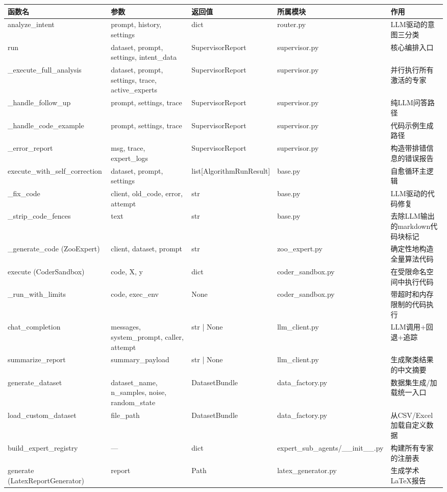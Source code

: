 \documentclass[11pt,a4paper]{ctexbook}
\begin{document}
\begin{longtable}{p{2.5cm} p{2.5cm} p{2cm} p{2cm} p{3.5cm}}
    \toprule
    \textbf{函数名} & \textbf{参数} & \textbf{返回值} & \textbf{所属模块} & \textbf{作用} \\
    \midrule
    analyze\_intent & prompt, history, settings & dict & router.py & LLM驱动的意图三分类 \\
    \midrule
    run & dataset, prompt, settings, intent\_data & SupervisorReport & supervisor.py & 核心编排入口 \\
    \midrule
    \_execute\_full\_analysis & dataset, prompt, settings, trace, active\_experts & SupervisorReport & supervisor.py & 并行执行所有激活的专家 \\
    \midrule
    \_handle\_follow\_up & prompt, settings, trace & SupervisorReport & supervisor.py & 纯LLM问答路径 \\
    \midrule
    \_handle\_code\_example & prompt, settings, trace & SupervisorReport & supervisor.py & 代码示例生成路径 \\
    \midrule
    \_error\_report & msg, trace, expert\_logs & SupervisorReport & supervisor.py & 构造带排错信息的错误报告 \\
    \midrule
    execute\_with\_self\_correction & dataset, prompt, settings & list[AlgorithmRunResult] & base.py & 自愈循环主逻辑 \\
    \midrule
    \_fix\_code & client, old\_code, error, attempt & str & base.py & LLM驱动的代码修复 \\
    \midrule
    \_strip\_code\_fences & text & str & base.py & 去除LLM输出的markdown代码块标记 \\
    \midrule
    \_generate\_code (ZooExpert) & client, dataset, prompt & str & zoo\_expert.py & 确定性地构造全量算法代码 \\
    \midrule
    execute (CoderSandbox) & code, X, y & dict & coder\_sandbox.py & 在受限命名空间中执行代码 \\
    \midrule
    \_run\_with\_limits & code, exec\_env & None & coder\_sandbox.py & 带超时和内存限制的代码执行 \\
    \midrule
    chat\_completion & messages, system\_prompt, caller, attempt & str | None & llm\_client.py & LLM调用+回退+追踪 \\
    \midrule
    summarize\_report & summary\_payload & str | None & llm\_client.py & 生成聚类结果的中文摘要 \\
    \midrule
    generate\_dataset & dataset\_name, n\_samples, noise, random\_state & DatasetBundle & data\_factory.py & 数据集生成/加载统一入口 \\
    \midrule
    load\_custom\_dataset & file\_path & DatasetBundle & data\_factory.py & 从CSV/Excel加载自定义数据 \\
    \midrule
    build\_expert\_registry & — & dict & expert\_sub\_agents/\_\_init\_\_.py & 构建所有专家的注册表 \\
    \midrule
    generate (LatexReportGenerator) & report & Path & latex\_generator.py & 生成学术LaTeX报告 \\
    \bottomrule
\end{longtable}
\end{document}
